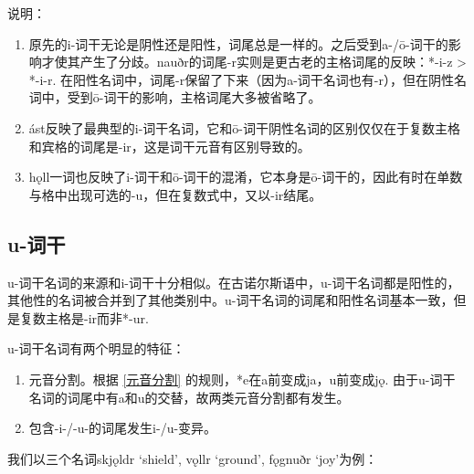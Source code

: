 说明：

\begin{enumerate}
  \item
        原先的i-词干无论是阴性还是阳性，词尾总是一样的。之后受到a-/ō-词干的影响才使其产生了分歧。nauðr的词尾-r实则是更古老的主格词尾的反映：*-i-z > *-i-r. 在阳性名词中，词尾-r保留了下来（因为a-词干名词也有-r），但在阴性名词中，受到ō-词干的影响，主格词尾大多被省略了。
  \item
        ást反映了最典型的i-词干名词，它和ō-词干阴性名词的区别仅仅在于复数主格和宾格的词尾是-ir，这是词干元音有区别导致的。
  \item
        hǫll一词也反映了i-词干和ō-词干的混淆，它本身是ō-词干的，因此有时在单数与格中出现可选的-u，但在复数式中，又以-ir结尾。
\end{enumerate}

\subsection{u-词干}
\label{u-词干}

u-词干名词的来源和i-词干十分相似。在古诺尔斯语中，u-词干名词都是阳性的，其他性的名词被合并到了其他类别中。u-词干名词的词尾和阳性名词基本一致，但是复数主格是-ir而非*-ur.

u-词干名词有两个明显的特征：

\begin{enumerate}
  \item
        元音分割。根据 \ref{元音分割} 的规则，*e在a前变成ja，u前变成jǫ.
        由于u-词干名词的词尾中有a和u的交替，故两类元音分割都有发生。
  \item
        包含-i-/-u-的词尾发生i-/u-变异。
\end{enumerate}

我们以三个名词skjǫldr `shield', vǫllr `ground', fǫgnuðr `joy'为例：

